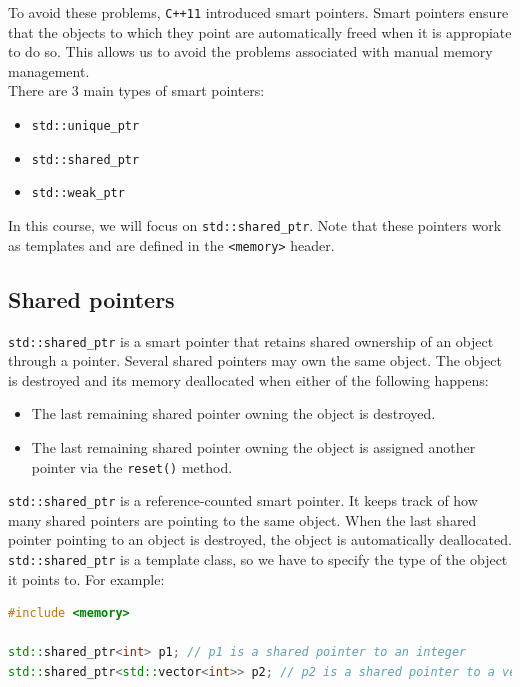 To avoid these problems, \texttt{C++11} introduced smart pointers. Smart pointers ensure
that the objects to which they point are automatically freed when it is appropiate to do
so. This allows us to avoid the problems associated with manual memory management.\\

There are 3 main types of smart pointers:

\begin {itemize}
    \item \texttt{std::unique\_ptr}
    \item \texttt{std::shared\_ptr}
    \item \texttt{std::weak\_ptr}
\end{itemize}

In this course, we will focus on \texttt{std::shared\_ptr}. Note that these pointers work as 
templates and are defined in the \texttt{<memory>} header.

\subsection{Shared pointers}

\texttt{std::shared\_ptr} is a smart pointer that retains shared ownership of an object through
a pointer. Several shared pointers may own the same object. The object is destroyed and its memory
deallocated when either of the following happens:

\begin{itemize}
    \item The last remaining shared pointer owning the object is destroyed.
    \item The last remaining shared pointer owning the object is assigned another pointer via
    the \texttt{reset()} method.
\end{itemize}

\texttt{std::shared\_ptr} is a reference-counted smart pointer. It keeps track of how many shared
pointers are pointing to the same object. When the last shared pointer pointing to an object is
destroyed, the object is automatically deallocated.\\

\texttt{std::shared\_ptr} is a template class, so we have to specify the type of the object it points
to. For example:

\begin{lstlisting}[language=C++]
#include <memory>

std::shared_ptr<int> p1; // p1 is a shared pointer to an integer
std::shared_ptr<std::vector<int>> p2; // p2 is a shared pointer to a vector of integers
\end{lstlisting}

